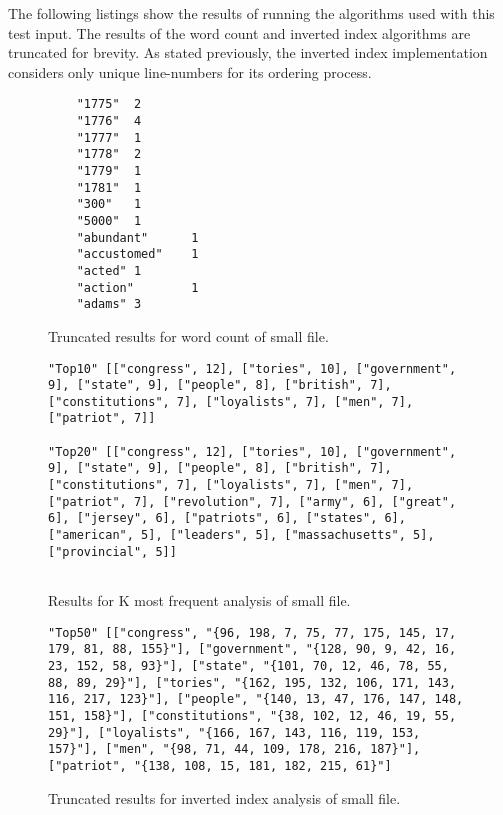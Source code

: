 \documentclass[journal,10pt]{IEEEtran}
\begin{document}
The following listings show the results of running the algorithms used with this test input. The results of the word count and inverted index algorithms are truncated for brevity. As stated previously, the inverted index implementation considers only unique line-numbers for its ordering process.
\begin{figure}[H]
    \centering
    \begin{lstlisting}
    "1775"  2
    "1776"  4
    "1777"  1
    "1778"  2
    "1779"  1
    "1781"  1
    "300"   1
    "5000"  1
    "abundant"      1
    "accustomed"    1
    "acted" 1
    "action"        1
    "adams" 3
    \end{lstlisting}
    \caption{Truncated results for word count of small file.}
    \label{fig:my_label}
\end{figure}

\begin{figure}[H]
    \centering
    \begin{lstlisting}
"Top10" [["congress", 12], ["tories", 10], ["government", 9], ["state", 9], ["people", 8], ["british", 7], ["constitutions", 7], ["loyalists", 7], ["men", 7], ["patriot", 7]]

"Top20" [["congress", 12], ["tories", 10], ["government", 9], ["state", 9], ["people", 8], ["british", 7], ["constitutions", 7], ["loyalists", 7], ["men", 7], ["patriot", 7], ["revolution", 7], ["army", 6], ["great", 6], ["jersey", 6], ["patriots", 6], ["states", 6], ["american", 5], ["leaders", 5], ["massachusetts", 5], ["provincial", 5]]


    \end{lstlisting}
    \caption{Results for K most frequent analysis of small file.}
    \label{fig:my_label}
\end{figure}


\begin{figure}[H]
    \centering
    \begin{lstlisting}
"Top50" [["congress", "{96, 198, 7, 75, 77, 175, 145, 17, 179, 81, 88, 155}"], ["government", "{128, 90, 9, 42, 16, 23, 152, 58, 93}"], ["state", "{101, 70, 12, 46, 78, 55, 88, 89, 29}"], ["tories", "{162, 195, 132, 106, 171, 143, 116, 217, 123}"], ["people", "{140, 13, 47, 176, 147, 148, 151, 158}"], ["constitutions", "{38, 102, 12, 46, 19, 55, 29}"], ["loyalists", "{166, 167, 143, 116, 119, 153, 157}"], ["men", "{98, 71, 44, 109, 178, 216, 187}"], ["patriot", "{138, 108, 15, 181, 182, 215, 61}"]
    \end{lstlisting}
    \caption{Truncated results for inverted index analysis of small file.}
    \label{fig:my_label}
\end{figure}
\end{document}
